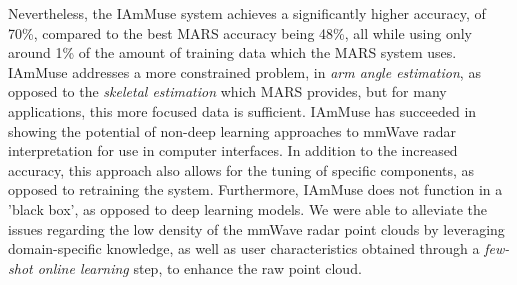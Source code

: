 Nevertheless, the IAmMuse system achieves a significantly higher accuracy, of 70\%, compared to the best MARS accuracy being 48\%, all while using only around 1\% of the amount of training data which the MARS system uses.
IAmMuse addresses a more constrained problem, in \textit{arm angle estimation}, as opposed to the \textit{skeletal estimation} which MARS provides, but for many applications, this more focused data is sufficient.
IAmMuse has succeeded in showing the potential of non-deep learning approaches to mmWave radar interpretation for use in computer interfaces.
In addition to the increased accuracy, this approach also allows for the tuning of specific components, as opposed to retraining the system.
Furthermore, IAmMuse does not function in a 'black box', as opposed to deep learning models.
We were able to alleviate the issues regarding the low density of the mmWave radar point clouds by leveraging domain-specific knowledge, as well as user characteristics obtained through a \textit{few-shot online learning} step, to enhance the raw point cloud.


        



